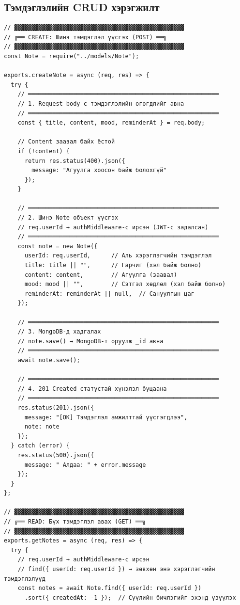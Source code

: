 \subsection{Тэмдэглэлийн CRUD хэрэгжилт}

\begin{lstlisting}[caption={controllers/noteController.js -- Тэмдэглэл үүсгэх}]
// ▓▓▓▓▓▓▓▓▓▓▓▓▓▓▓▓▓▓▓▓▓▓▓▓▓▓▓▓▓▓▓▓▓▓▓▓▓▓▓▓▓▓▓▓▓▓▓▓▓
// ╔══ CREATE: Шинэ тэмдэглэл үүсгэх (POST) ══╗
// ▓▓▓▓▓▓▓▓▓▓▓▓▓▓▓▓▓▓▓▓▓▓▓▓▓▓▓▓▓▓▓▓▓▓▓▓▓▓▓▓▓▓▓▓▓▓▓▓▓
const Note = require("../models/Note");

exports.createNote = async (req, res) => {
  try {
    // ═══════════════════════════════════════════════════════
    // 1. Request body-с тэмдэглэлийн өгөгдлийг авна
    // ═══════════════════════════════════════════════════════
    const { title, content, mood, reminderAt } = req.body;

    // Content заавал байх ёстой
    if (!content) {
      return res.status(400).json({
        message: "Агуулга хоосон байж болохгүй"
      });
    }

    // ═══════════════════════════════════════════════════════
    // 2. Шинэ Note объект үүсгэх
    // req.userId → authMiddleware-с ирсэн (JWT-с задалсан)
    // ═══════════════════════════════════════════════════════
    const note = new Note({
      userId: req.userId,      // Аль хэрэглэгчийн тэмдэглэл
      title: title || "",      // Гарчиг (хэл байж болно)
      content: content,        // Агуулга (заавал)
      mood: mood || "",        // Сэтгэл хөдлөл (хэл байж болно)
      reminderAt: reminderAt || null,  // Сануулгын цаг
    });

    // ═══════════════════════════════════════════════════════
    // 3. MongoDB-д хадгалах
    // note.save() → MongoDB-т оруулж _id авна
    // ═══════════════════════════════════════════════════════
    await note.save();

    // ═══════════════════════════════════════════════════════
    // 4. 201 Created статустай хүнэлэл буцаана
    // ═══════════════════════════════════════════════════════
    res.status(201).json({
      message: "[OK] Тэмдэглэл амжилттай үүсгэгдлээ",
      note: note
    });
  } catch (error) {
    res.status(500).json({
      message: " Алдаа: " + error.message
    });
  }
};

// ▓▓▓▓▓▓▓▓▓▓▓▓▓▓▓▓▓▓▓▓▓▓▓▓▓▓▓▓▓▓▓▓▓▓▓▓▓▓▓▓▓▓▓▓▓▓▓▓▓
// ╔══ READ: Бүх тэмдэглэл авах (GET) ══╗
// ▓▓▓▓▓▓▓▓▓▓▓▓▓▓▓▓▓▓▓▓▓▓▓▓▓▓▓▓▓▓▓▓▓▓▓▓▓▓▓▓▓▓▓▓▓▓▓▓▓
exports.getNotes = async (req, res) => {
  try {
    // req.userId → authMiddleware-с ирсэн
    // find({ userId: req.userId }) → зөвхөн энэ хэрэглэгчийн тэмдэглэлүүд
    const notes = await Note.find({ userId: req.userId })
      .sort({ createdAt: -1 });  // Сүүлийн бичлэгийг эхэнд үзүүлэх


\end{lstlisting}
